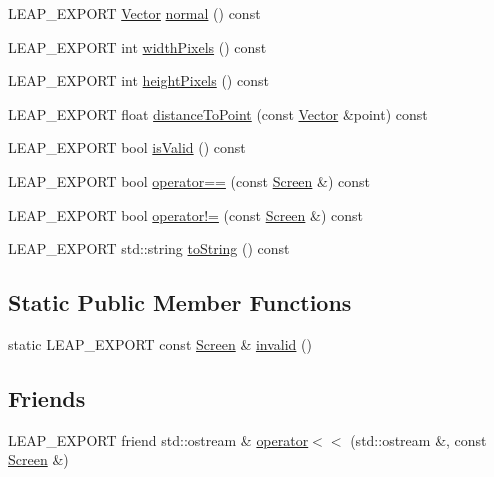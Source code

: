 \begin{DoxyCompactItemize}
L\+E\+A\+P\+\_\+\+E\+X\+P\+O\+R\+T \hyperlink{struct_leap_1_1_vector}{Vector} \hyperlink{class_leap_1_1_screen_a3cf3c55d32dc11b097d1dbdd14e1ee1d}{normal} () const 
\item 
L\+E\+A\+P\+\_\+\+E\+X\+P\+O\+R\+T int \hyperlink{class_leap_1_1_screen_a183e75cf160db9dfa9653c0f128adac0}{width\+Pixels} () const 
\item 
L\+E\+A\+P\+\_\+\+E\+X\+P\+O\+R\+T int \hyperlink{class_leap_1_1_screen_a73ec00f33fe7aee01e2a63de06311d79}{height\+Pixels} () const 
\item 
L\+E\+A\+P\+\_\+\+E\+X\+P\+O\+R\+T float \hyperlink{class_leap_1_1_screen_a0eeef9ff9931be5d9d9b34f0b0068e40}{distance\+To\+Point} (const \hyperlink{struct_leap_1_1_vector}{Vector} \&point) const 
\item 
L\+E\+A\+P\+\_\+\+E\+X\+P\+O\+R\+T bool \hyperlink{class_leap_1_1_screen_aebb6c054d2b35e27b8991618945ec614}{is\+Valid} () const 
\item 
L\+E\+A\+P\+\_\+\+E\+X\+P\+O\+R\+T bool \hyperlink{class_leap_1_1_screen_a874b0b7326974a98d832a368cf9d815a}{operator==} (const \hyperlink{class_leap_1_1_screen}{Screen} \&) const 
\item 
L\+E\+A\+P\+\_\+\+E\+X\+P\+O\+R\+T bool \hyperlink{class_leap_1_1_screen_a7767f6df72c0ab3daecdef5960061ad8}{operator!=} (const \hyperlink{class_leap_1_1_screen}{Screen} \&) const 
\item 
L\+E\+A\+P\+\_\+\+E\+X\+P\+O\+R\+T std\+::string \hyperlink{class_leap_1_1_screen_a6215a10c9948f75522d2932b6b91b35c}{to\+String} () const 
\end{DoxyCompactItemize}
\subsection*{Static Public Member Functions}
\begin{DoxyCompactItemize}
\item 
static L\+E\+A\+P\+\_\+\+E\+X\+P\+O\+R\+T const \hyperlink{class_leap_1_1_screen}{Screen} \& \hyperlink{class_leap_1_1_screen_a380e39a87c63fd4915f1f5e5c5db0c3c}{invalid} ()
\end{DoxyCompactItemize}
\subsection*{Friends}
\begin{DoxyCompactItemize}
\item 
L\+E\+A\+P\+\_\+\+E\+X\+P\+O\+R\+T friend std\+::ostream \& \hyperlink{class_leap_1_1_screen_a9d392849d557b2c5107a836a227d63a6}{operator$<$$<$} (std\+::ostream \&, const \hyperlink{class_leap_1_1_screen}{Screen} \&)
\end{DoxyCompactItemize}
